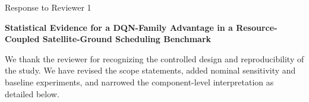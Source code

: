 

\begin{center}
{\Large Response to Reviewer 1}\par
\medskip
{\bfseries Statistical Evidence for a DQN-Family Advantage in a Resource-Coupled Satellite-Ground Scheduling Benchmark}
\end{center}

We thank the reviewer for recognizing the controlled design and reproducibility of the study. We have revised the scope statements, added nominal sensitivity and baseline experiments, and narrowed the component-level interpretation as detailed below.




